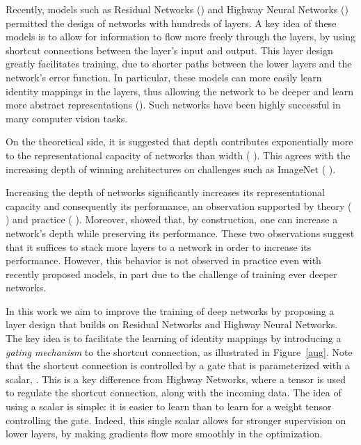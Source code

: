 \documentclass{article} \RequirePackage{amsmath,amsthm,amsfonts,amssymb}
\begin{document}
Recently, models such as Residual Networks (\cite{resnet1}) and Highway Neural Networks (\cite{highway}) permitted the design of networks with hundreds of layers. A key idea of these models is to allow for information to flow more freely through the layers, by using shortcut connections between the layer's input and output. This layer design greatly facilitates training, due to shorter paths between the lower layers and the network's error function. In particular, these models can more easily learn identity mappings in the layers, thus allowing the network to be deeper and learn more abstract representations (\cite{representations}). Such networks have been highly successful in many computer vision tasks. 

On the theoretical side, it is suggested that depth contributes exponentially more to the representational capacity of networks than width (\cite{exp1} \cite{exp2} \cite{exp3} \cite{exp4}). This agrees with the increasing depth of winning architectures on challenges such as ImageNet (\cite{resnet1} \cite{googlenet}). 


Increasing the depth of networks significantly increases its representational capacity and consequently its performance, an observation supported by theory (\cite{exp1} \cite{exp2} \cite{exp3} \cite{exp4}) and practice (\cite{resnet1} \cite{googlenet}). Moreover, \cite{resnet1} showed that, by construction, one can increase a network's depth while preserving its performance. These two observations suggest that it suffices to stack more layers to a network in order to increase its performance. However, this behavior is not observed in practice even with recently proposed models, in part due to the challenge of training ever deeper networks. 


In this work we aim to improve the training of deep networks by proposing a layer design that builds on Residual Networks and Highway Neural Networks. The key idea is to facilitate the learning of identity mappings by introducing a {\em gating mechanism} to the shortcut connection, as illustrated in Figure~\ref{aug}. Note that the shortcut connection is controlled by a gate that is parameterized with a scalar, . This is a key difference from Highway Networks, where a tensor is used to regulate the shortcut connection, along with the incoming data. The idea of using a scalar is simple: it is easier to learn  than to learn  for a weight tensor  controlling the gate. Indeed, this single scalar allows for stronger supervision on lower layers, by making gradients flow more smoothly in the optimization.
\end{document}
